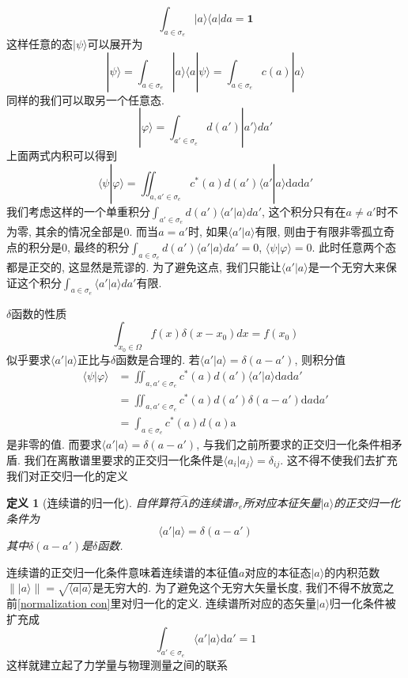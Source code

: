 \documentclass[a4paper,11pt]{book}
\newtheorem{definition}{\hspace{2em}定义}[section]
\begin{document}
\begin{equation*}
  \int_{a\in\sigma_e}|a\rangle\langle a|da=\mathbf{1}
\end{equation*}
这样任意的态$|\psi\rangle$可以展开为
\begin{equation*}
  |\psi\rangle=\int_{a\in\sigma_e}|a\rangle\langle a|\psi\rangle=\int_{a\in\sigma_e}c(a)|a\rangle
\end{equation*}
同样的我们可以取另一个任意态.
\begin{equation*}
  |\varphi\rangle=\int_{a'\in\sigma_e}d(a')|a'\rangle da'
\end{equation*}
上面两式内积可以得到
\begin{equation*}
  \langle\psi|\varphi\rangle=\iint_{a,a'\in\sigma_e}c^*(a)d(a')\langle a'|a\rangle \mathrm{d}a\mathrm{d}a'
\end{equation*}
我们考虑这样的一个单重积分$\int_{a'\in\sigma_e}d(a')\langle a'|a\rangle da'$, 这个积分只有在$a\neq a'$时不为零, 其余的情况全部是$0$. 而当$a=a'$时, 如果$\langle a'|a\rangle$有限, 则由于有限非零孤立奇点的积分是$0$, 最终的积分$\int_{a\in\sigma_e}d(a')\langle a'|a\rangle da'=0$, $\langle\psi|\varphi\rangle=0$. 此时任意两个态都是正交的, 这显然是荒谬的. 为了避免这点, 我们只能让$\langle a'|a\rangle$是一个无穷大来保证这个积分$\int_{a\in\sigma_e}\langle a'|a\rangle da'$有限.

$\delta$函数的性质
\begin{equation*}
  \int_{x_0\in\Omega}f(x)\delta(x-x_0)dx=f(x_0)
\end{equation*}
似乎要求$\langle a'|a\rangle$正比与$\delta$函数是合理的. 若$\langle a'|a\rangle=\delta(a-a')$, 则积分值
\begin{equation*}
  \begin{split}
     \langle\psi|\varphi\rangle&=\iint_{a,a'\in\sigma_e}c^*(a)d(a')\langle a'|a\rangle \mathrm{d}a\mathrm{d}a'\\
       &=\iint_{a,a'\in\sigma_e}c^*(a)d(a')\delta(a-a') \mathrm{d}a\mathrm{d}a'\\
       &=\int_{a\in\sigma_e}c^*(a)d(a)\mathrm{a}
  \end{split}
\end{equation*}
是非零的值. 而要求$\langle a'|a\rangle=\delta(a-a')$, 与我们之前所要求的正交归一化条件相矛盾. 我们在离散谱里要求的正交归一化条件是$\langle a_i|a_j\rangle=\delta_{ij}$. 这不得不使我们去扩充我们对正交归一化的定义
\begin{definition}[连续谱的归一化]
  自伴算符$\hat{A}$的连续谱$\sigma_e$所对应本征矢量$|a\rangle$的正交归一化条件为
  \begin{equation*}
    \langle a'|a\rangle=\delta(a-a')
  \end{equation*}
  其中$\delta(a-a')$是$\delta$函数.
\end{definition}
连续谱的正交归一化条件意味着连续谱的本征值$a$对应的本征态$|a\rangle$的内积范数$\||a\rangle\|=\sqrt{\langle a|a\rangle}$是无穷大的. 为了避免这个无穷大矢量长度, 我们不得不放宽之前\ref{normalization con}里对归一化的定义. 连续谱所对应的态矢量$|a\rangle$归一化条件被扩充成
\begin{equation*}
  \int_{a'\in\sigma_e}\langle a'|a\rangle \mathrm{d}a'=1
\end{equation*}
这样就建立起了力学量与物理测量之间的联系
\end{document}
